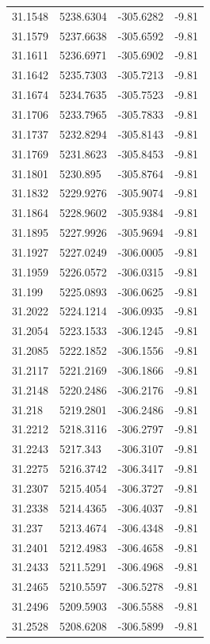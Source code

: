 \begin{table}[H]
\begin{tabular}{llll}
31.1548 & 5238.6304 & -305.6282 & -9.81 \\
31.1579 & 5237.6638 & -305.6592 & -9.81 \\
31.1611 & 5236.6971 & -305.6902 & -9.81 \\
31.1642 & 5235.7303 & -305.7213 & -9.81 \\
31.1674 & 5234.7635 & -305.7523 & -9.81 \\
31.1706 & 5233.7965 & -305.7833 & -9.81 \\
31.1737 & 5232.8294 & -305.8143 & -9.81 \\
31.1769 & 5231.8623 & -305.8453 & -9.81 \\
31.1801 & 5230.895 & -305.8764 & -9.81 \\
31.1832 & 5229.9276 & -305.9074 & -9.81 \\
31.1864 & 5228.9602 & -305.9384 & -9.81 \\
31.1895 & 5227.9926 & -305.9694 & -9.81 \\
31.1927 & 5227.0249 & -306.0005 & -9.81 \\
31.1959 & 5226.0572 & -306.0315 & -9.81 \\
31.199 & 5225.0893 & -306.0625 & -9.81 \\
31.2022 & 5224.1214 & -306.0935 & -9.81 \\
31.2054 & 5223.1533 & -306.1245 & -9.81 \\
31.2085 & 5222.1852 & -306.1556 & -9.81 \\
31.2117 & 5221.2169 & -306.1866 & -9.81 \\
31.2148 & 5220.2486 & -306.2176 & -9.81 \\
31.218 & 5219.2801 & -306.2486 & -9.81 \\
31.2212 & 5218.3116 & -306.2797 & -9.81 \\
31.2243 & 5217.343 & -306.3107 & -9.81 \\
31.2275 & 5216.3742 & -306.3417 & -9.81 \\
31.2307 & 5215.4054 & -306.3727 & -9.81 \\
31.2338 & 5214.4365 & -306.4037 & -9.81 \\
31.237 & 5213.4674 & -306.4348 & -9.81 \\
31.2401 & 5212.4983 & -306.4658 & -9.81 \\
31.2433 & 5211.5291 & -306.4968 & -9.81 \\
31.2465 & 5210.5597 & -306.5278 & -9.81 \\
31.2496 & 5209.5903 & -306.5588 & -9.81 \\
31.2528 & 5208.6208 & -306.5899 & -9.81 \\

\end{tabular}
\end{table}
